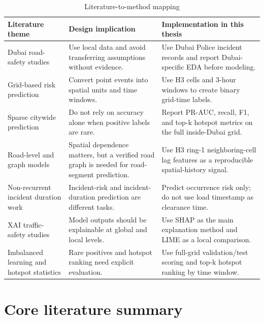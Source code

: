 \begin{table}[H]
\centering
\caption{Literature-to-method mapping}
\label{tab:literature_to_method_mapping}
\small
\begin{tabularx}{\textwidth}{L{0.27\textwidth}Y Y}
\toprule
\textbf{Literature theme} & \textbf{Design implication} & \textbf{Implementation in this thesis} \\
\midrule
Dubai road-safety studies & Use local data and avoid transferring assumptions without evidence. & Use Dubai Police incident records and report Dubai-specific EDA before modeling. \\
Grid-based risk prediction & Convert point events into spatial units and time windows. & Use H3 cells and 3-hour windows to create binary grid-time labels. \\
Sparse citywide prediction & Do not rely on accuracy alone when positive labels are rare. & Report PR-AUC, recall, F1, and top-k hotspot metrics on the full inside-Dubai grid. \\
Road-level and graph models & Spatial dependence matters, but a verified road graph is needed for road-segment prediction. & Use H3 ring-1 neighboring-cell lag features as a reproducible spatial-history signal. \\
Non-recurrent incident duration work & Incident-risk and incident-duration prediction are different tasks. & Predict occurrence risk only; do not use load timestamp as clearance time. \\
XAI traffic-safety studies & Model outputs should be explainable at global and local levels. & Use SHAP as the main explanation method and LIME as a local comparison. \\
Imbalanced learning and hotspot statistics & Rare positives and hotspot ranking need explicit evaluation. & Use full-grid validation/test scoring and top-k hotspot ranking by time window. \\
\bottomrule
\end{tabularx}
\end{table}

\section{Core literature summary}

